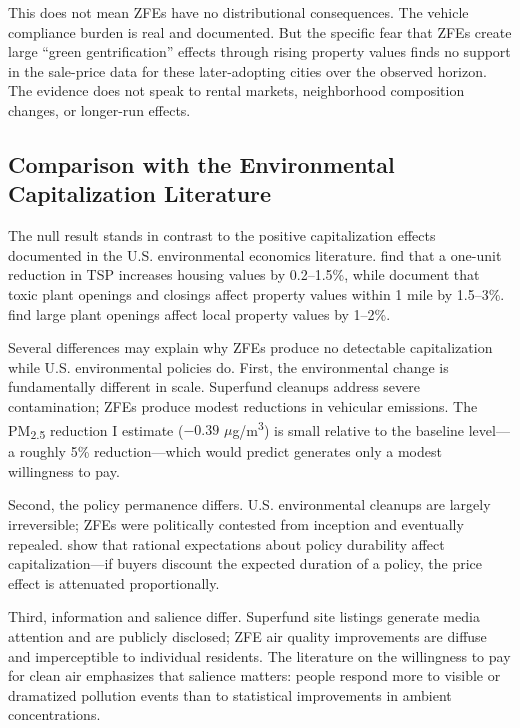 \documentclass[12pt]{article}
\begin{document}
This does not mean ZFEs have no distributional consequences. The vehicle compliance burden is real and documented. But the specific fear that ZFEs create large ``green gentrification'' effects through rising property values finds no support in the sale-price data for these later-adopting cities over the observed horizon. The evidence does not speak to rental markets, neighborhood composition changes, or longer-run effects.

\subsection{Comparison with the Environmental Capitalization Literature}

The null result stands in contrast to the positive capitalization effects documented in the U.S. environmental economics literature. \citet{chay2005does} find that a one-unit reduction in TSP increases housing values by 0.2--1.5\%, while \citet{currie2015environmental} document that toxic plant openings and closings affect property values within 1 mile by 1.5--3\%. \citet{greenstone2009identifying} find large plant openings affect local property values by 1--2\%.

Several differences may explain why ZFEs produce no detectable capitalization while U.S. environmental policies do. First, the environmental change is fundamentally different in scale. Superfund cleanups address severe contamination; ZFEs produce modest reductions in vehicular emissions. The PM\textsubscript{2.5} reduction I estimate ($-0.39$ $\mu$g/m\textsuperscript{3}) is small relative to the baseline level---a roughly 5\% reduction---which \citet{ito2015willingness} would predict generates only a modest willingness to pay.

Second, the policy permanence differs. U.S. environmental cleanups are largely irreversible; ZFEs were politically contested from inception and eventually repealed. \citet{bajari2012hedonic} show that rational expectations about policy durability affect capitalization---if buyers discount the expected duration of a policy, the price effect is attenuated proportionally.

Third, information and salience differ. Superfund site listings generate media attention and are publicly disclosed; ZFE air quality improvements are diffuse and imperceptible to individual residents. The literature on the willingness to pay for clean air \citep{ito2015willingness, deryugina2019mortality} emphasizes that salience matters: people respond more to visible or dramatized pollution events than to statistical improvements in ambient concentrations.
\end{document}
